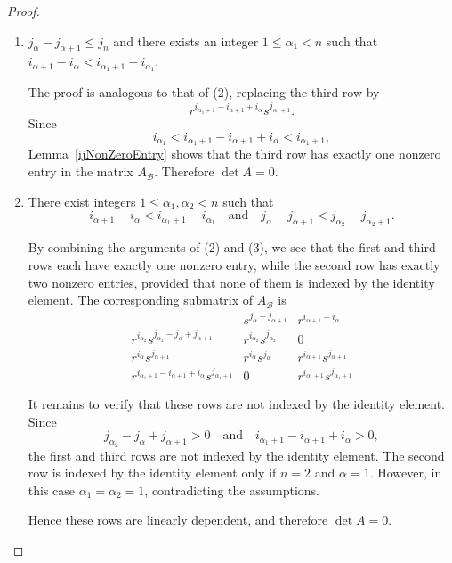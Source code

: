 \documentclass[11pt,reqno]{amsart}
\theoremstyle{plain}
\theoremstyle{remark}
\theoremstyle{definition}
\begin{document}
\begin{proof}
\begin{enumerate}
\item $j_\alpha-j_{\alpha+1}\leq j_n$ and there exists an integer $1\leq \alpha_1<n$ such that
\(i_{\alpha+1}-i_{\alpha}<i_{\alpha_1+1}-i_{\alpha_1}.\)

The proof is analogous to that of {\rm(2)}, replacing the third row by
\[
r^{i_{\alpha_1+1}-i_{\alpha+1}+i_\alpha}s^{j_{\alpha_1+1}}.
\]
Since
\[
i_{\alpha_1}
<
i_{\alpha_1+1}-i_{\alpha+1}+i_\alpha
<
i_{\alpha_1+1},
\]
Lemma~\ref{ijNonZeroEntry} shows that the third row has exactly one nonzero entry  in the matrix $A_{\mathcal B}$. Therefore $\det A=0$.

\item There exist integers $1\leq\alpha_1,\alpha_2<n$ such that
\[
i_{\alpha+1}-i_\alpha<i_{\alpha_1+1}-i_{\alpha_1}
\quad\text{and}\quad
j_\alpha-j_{\alpha+1}<j_{\alpha_2}-j_{\alpha_2+1}.
\]

By combining the arguments of {\rm(2)} and {\rm(3)}, we see that the first and third rows each have exactly one nonzero entry, while the second row has exactly two nonzero entries, provided that none of them is indexed by the identity element. The corresponding submatrix of $A_{\mathcal B}$ is
\[
\begin{array}{c|cc}
 & s^{j_\alpha-j_{\alpha+1}} & r^{i_{\alpha+1}-i_\alpha} \\ \hline
r^{i_{\alpha_2}}s^{j_{\alpha_2}-j_\alpha+j_{\alpha+1}}
& r^{i_{\alpha_2}}s^{j_{\alpha_2}} & 0 \\
r^{i_\alpha}s^{j_{\alpha+1}}
& r^{i_\alpha}s^{j_\alpha}
& r^{i_{\alpha+1}}s^{j_{\alpha+1}} \\
r^{i_{\alpha_1+1}-i_{\alpha+1}+i_\alpha}s^{j_{\alpha_1+1}}
& 0
& r^{i_{\alpha_1+1}}s^{j_{\alpha_1+1}}
\end{array}
\]

It remains to verify that these rows are not indexed by the identity element. Since
\[
j_{\alpha_2}-j_\alpha+j_{\alpha+1}>0
\quad\text{and}\quad
i_{\alpha_1+1}-i_{\alpha+1}+i_\alpha>0,
\]
the first and third rows are not indexed by the identity element. The second row is indexed by the identity element only if
\(n=2\) and \(\alpha=1.\)
However, in this case $\alpha_1=\alpha_2=1$, contradicting the assumptions.

Hence these rows are linearly dependent, and therefore $\det A=0$.
\end{enumerate}
\end{proof}
\end{document}
